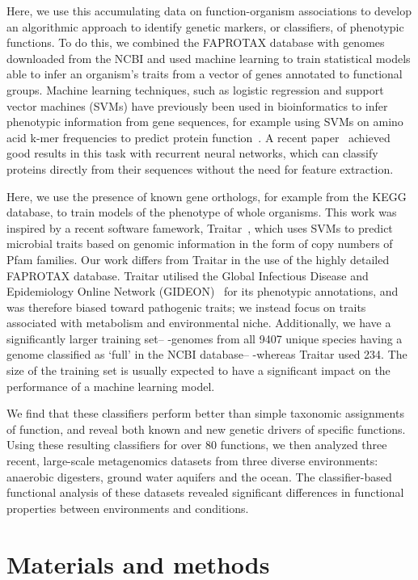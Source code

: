 \documentclass[10pt,letterpaper]{article}
\begin{document}
Here, we use this accumulating data on function-organism associations to develop an algorithmic
approach to identify genetic markers, or classifiers, of phenotypic functions. To do this, we combined the FAPROTAX database with genomes downloaded from the NCBI and used machine learning to train statistical models able to infer an organism's traits from a vector of 
genes annotated to functional groups. Machine learning techniques, such as logistic regression and support vector machines (SVMs) have previously been used in bioinformatics to infer phenotypic information from gene sequences, for example using SVMs on amino acid k-mer frequencies to predict protein function~\cite{Leslie2002,Cai2003,Someya2010}. A recent paper~\cite{Asgari2015} achieved good results in this task with recurrent neural networks, which can classify proteins directly from their sequences without the need for feature extraction.

Here, we use the presence of known gene orthologs, for example from the KEGG
database, to train models of the phenotype of whole organisms. This work was inspired by a
recent software famework, Traitar~\cite{Weimann2016}, which uses SVMs to predict
microbial traits based on genomic information in the form of copy numbers of Pfam families.
Our work differs from Traitar in the use of the highly detailed FAPROTAX database. Traitar
utilised the Global Infectious Disease and Epidemiology Online Network
(GIDEON)~\cite{Berger2005} for its phenotypic annotations, and was therefore biased
toward pathogenic traits; we instead focus on traits associated with metabolism and
environmental niche. Additionally, we have a significantly larger training set-- -genomes from
all 9407 unique species having a genome classified as `full' in the NCBI database-- -whereas
Traitar used 234. The size of the training set is usually expected to have a significant impact on
the performance of a machine learning model.

We find that these classifiers perform better
than simple taxonomic assignments of function, and reveal both known and new genetic
drivers of specific functions. Using these resulting classifiers for over 80 functions, we then
analyzed three recent, large-scale metagenomics datasets from three diverse environments:
anaerobic digesters, ground water aquifers and the ocean. The classifier-based functional
analysis of these datasets revealed significant differences in functional properties between environments and conditions.


\section*{Materials and methods}
\end{document}
